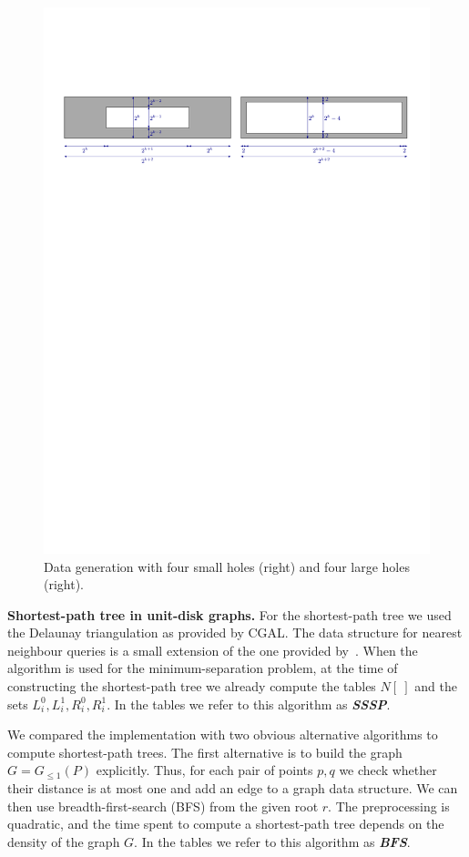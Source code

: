 \documentclass[a4paper,USenglish]{lipics}
\newcommand{\GG}{\ensuremath{G_{\le 1}}}
\def\DEF#1{\textbf{\emph{#1}}}
\let\le\leqslant
\def\myparagraph#1{\medskip\noindent\textbf{#1.}}
\begin{document}
\begin{figure}
	\includegraphics[width=\textwidth,page=2]{data_generation}
	\caption{Data generation with four small holes (right) and four large holes (right).}
	\label{fig:data_generation2}
\end{figure}


\myparagraph{Shortest-path tree in unit-disk graphs}
For the shortest-path tree we used the Delaunay triangulation as provided by CGAL.
The data structure for nearest neighbour queries is a small extension of
the one provided by~\cite{cgal:k-vda2-15a}. 
When the algorithm is used for the minimum-separation problem,
at the time of constructing the shortest-path tree we already
compute the tables $N[~]$ and the sets $L^0_i,L^1_i,R^0_i,R^1_i$.
In the tables we refer to this algorithm as \DEF{SSSP}.

We compared the implementation with two obvious alternative algorithms to
compute shortest-path trees.
The first alternative is to build the graph $G=\GG(P)$ explicitly. 
Thus, for each pair of points $p,q$ we check whether their distance is
at most one and add an edge to a graph data structure.
We can then use breadth-first-search (BFS) from the given root $r$.
The preprocessing is quadratic, and the time spent to compute
a shortest-path tree depends on the density of the graph $G$.
In the tables we refer to this algorithm as \DEF{BFS}.
\end{document}
